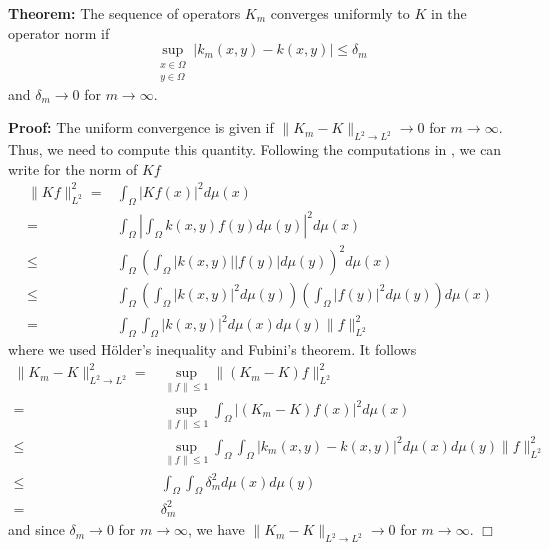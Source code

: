\documentclass[twoside,11pt]{article}
\begin{document}
\textbf{Theorem:}
The sequence of operators $K_m$ converges uniformly to $K$
in the operator norm if
\[
\sup_{\substack{x \in \Omega \\ y \in \Omega}}\left| k_m(x,y) - k(x,y) \right|
\leq \delta_m
\]
and $\delta_m \to 0$ for $m \to \infty$.

\textbf{Proof:}
The uniform convergence is given if
$\|K_m-K\|_{L^2 \to L^2} \to 0$
for $m \to \infty$.
Thus, we need to compute this quantity.
Following the computations in \cite{werner},
we can write for the norm of $Kf$
\begin{align*}
\|Kf\|^2_{L^2}
= & \int_\Omega |K f(x)|^2 d\mu(x)\\
= & \int_\Omega \left|\int_\Omega k(x,y) f(y) d\mu(y)\right|^2 d\mu(x)\\
\leq & \int_\Omega \left(\int_\Omega |k(x,y)| |f(y)| d\mu(y)\right)^2 d\mu(x)\\
\leq & \int_\Omega \left(\int_\Omega |k(x,y)|^2  d\mu(y)\right)
  \left(\int_\Omega |f(y)|^2 d\mu(y)\right) d\mu(x)\\
= & \int_\Omega \int_\Omega |k(x,y)|^2 d\mu(x) d\mu(y) \|f\|^2_{L^2}
\end{align*}
where we used H\"older's inequality and Fubini's theorem.
It follows
\begin{align*}
\|K_m-K\|_{L^2 \to L^2}^2
= & \sup_{\|f\|\leq 1} \|(K_m - K) f\|_{L^2}^2 \\
= & \sup_{\|f\|\leq 1} \int_\Omega |(K_m - K) f(x)|^2 d\mu(x)\\
\leq & \sup_{\|f\|\leq 1} 
  \int_\Omega \int_\Omega |k_m(x,y) - k(x,y)|^2 d\mu(x) d\mu(y) \|f\|^2_{L^2} \\
\leq & \int_\Omega \int_\Omega \delta_m^2 d\mu(x) d\mu(y) \\
= & \delta_m^2
\end{align*}
and since $\delta_m \to 0$ for $m \to \infty$,
we have $\|K_m-K\|_{L^2 \to L^2} \to 0$
for $m \to \infty$.
$\Box$



\end{document}
